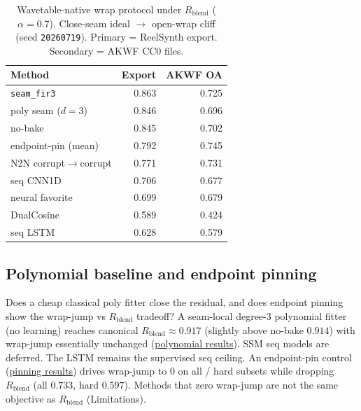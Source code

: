 \begin{table}[t]
  \centering
  \caption{Wavetable-native wrap protocol under $R_{\mathrm{blend}}$ ($\alpha{=}0.7$). Close-seam ideal $\to$ open-wrap cliff (seed \texttt{20260719}). Primary = ReelSynth export. Secondary = AKWF CC0 files.}
  \label{tab:real-wt}
  \setlength{\tabcolsep}{3pt}
  \begin{tabular}{@{}lrr@{}}
    \toprule
    Method & Export & AKWF OA \\
    \midrule
    \texttt{seam\_fir3} & 0.863 & 0.725 \\
    poly seam ($d{=}3$) & 0.846 & 0.696 \\
    no-bake & 0.845 & 0.702 \\
    endpoint-pin (mean) & 0.792 & 0.745 \\
    N2N corrupt$\to$corrupt & 0.771 & 0.731 \\
    seq CNN1D & 0.706 & 0.677 \\
    neural favorite & 0.699 & 0.679 \\
    DualCosine & 0.589 & 0.424 \\
    seq LSTM & 0.628 & 0.579 \\
    \bottomrule
  \end{tabular}
\end{table}

\subsection{Polynomial baseline and endpoint pinning}
\label{sec:poly-jump}

Does a cheap classical poly fitter close the residual, and does endpoint pinning show the wrap-jump vs $R_{\mathrm{blend}}$ tradeoff?
A seam-local degree-3 polynomial fitter (no learning) reaches canonical $R_{\mathrm{blend}}\approx 0.917$ (slightly above no-bake $0.914$) with wrap-jump essentially unchanged (\href{https://github.com/reeldemo/denoise-opt-meta/blob/master/paper/Unsupervised_Wavetable_Seam_Artifact_Repair_via_Hybrid_GA-PPO_Meta-Search_v11/figures/poly_baseline.json}{polynomial results}).
SSM seq models are deferred. The LSTM remains the supervised seq ceiling.
An endpoint-pin control (\href{https://github.com/reeldemo/denoise-opt-meta/blob/master/paper/Unsupervised_Wavetable_Seam_Artifact_Repair_via_Hybrid_GA-PPO_Meta-Search_v11/figures/jump_control.json}{pinning results}) drives wrap-jump to $0$ on all / hard subsets while dropping $R_{\mathrm{blend}}$ (all $0.733$, hard $0.597$).
Methods that zero wrap-jump are not the same objective as $R_{\mathrm{blend}}$ (Limitations).

